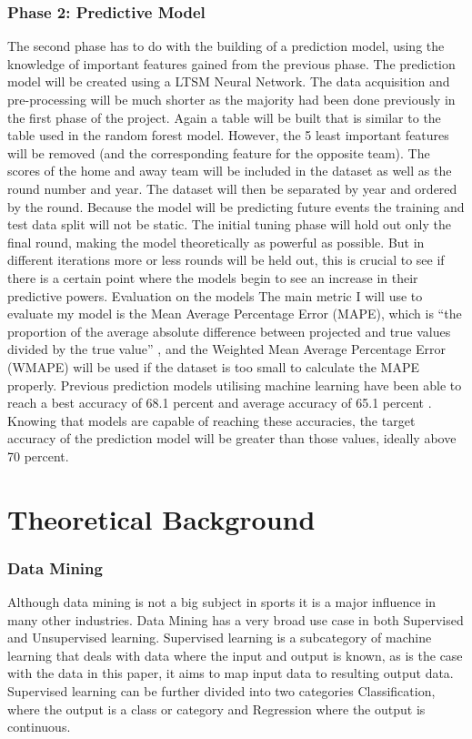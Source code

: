 \documentclass{imc-inf}
\begin{document}
	
	\subsection{Phase 2: Predictive Model}
	The second phase has to do with the building of a prediction model, using the knowledge of important features gained from the previous phase.
	The prediction model will be created using a LTSM Neural Network. The data acquisition and pre-processing will be much shorter as the majority had been done previously in the first phase of the project. Again a table will be built that is similar to the table used in the random forest model. However, the 5 least important features will be removed (and the corresponding feature for the opposite team). The scores of the home and away team will be included in the dataset as well as the round number and year.
	The dataset will then be separated by year and ordered by the round.
	Because the model will be predicting future events the training and test data split will not be static. The initial tuning phase will hold out only the final round, making the model theoretically as powerful as possible. But in different iterations more or less rounds will be held out, this is crucial to see if there is a certain point where the models begin to see an increase in their predictive powers.
	Evaluation on the models 
	The main metric I will use to evaluate my model is the Mean Average Percentage Error (MAPE), which is “the proportion of the average absolute difference between projected and true values divided by the true value” \cite{website:AIM}, and the Weighted Mean Average Percentage Error (WMAPE) will be used if the dataset is too small to calculate the MAPE properly. Previous prediction models utilising machine learning have been able to reach a best accuracy of 68.1 percent and average accuracy of 65.1 percent \cite{AFL_1}. Knowing that models are capable of reaching these accuracies, the target accuracy of the prediction model will be greater than those values, ideally above 70 percent.
	
	\chapter{Theoretical Background}\label{chap:background}
	\subsection{Data Mining}
	Although data mining is not a big subject in sports it is a major influence in many other industries. Data Mining has a very broad use case in both Supervised and Unsupervised learning. Supervised learning is a subcategory of machine learning that deals with data where the input and output is known, as is the case with the data in this paper, it aims to map input data to resulting output data. Supervised learning can be further divided into two categories Classification, where the output is a class or category and Regression where the output is continuous. 
	
\end{document}
